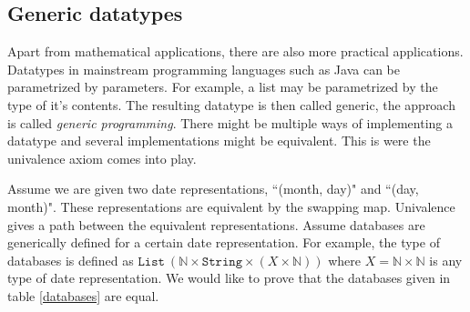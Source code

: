 \documentclass[12pt,a4paper,twoside,xetex]{book}
\newcommand{\keyword}[1]{\emph{#1}\index{#1}}
\newcommand{\op}[1]{\mathtt{#1}}
\begin{document}
\subsection{Generic datatypes}

Apart from mathematical applications, there are also more practical applications. Datatypes in mainstream programming languages such as Java can be parametrized by parameters. For example, a list may be parametrized by the type of it's contents. The resulting datatype is then called generic, the approach is called \keyword{generic programming}. There might be multiple ways of implementing a datatype and several implementations might be equivalent. This is were the univalence axiom comes into play. 

Assume we are given two date representations, ``(month, day)" and ``(day, month)". These representations are equivalent by the swapping map. Univalence gives a path between the equivalent representations. Assume databases are generically defined for a certain date representation. For example, the type of databases is defined as $\op{List} \ (\mathbb{N} \times \op{String} \times (X \times \mathbb{N}))$ where $X = \mathbb{N} \times \mathbb{N}$ is any type of date representation. We would like to prove that the databases given in table \ref{databases} are equal.
\end{document}
